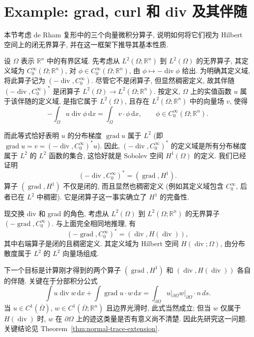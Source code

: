 \section{Example: grad, curl 和 div 及其伴随}\label{sec:vector-operators-adjoints}

本节考虑 de Rham 复形中的三个向量微积分算子, 说明如何将它们视为 Hilbert 空间上的闭无界算子, 并在这一框架下推导其基本性质.

设 $\Omega$ 表示 $\mathbb R^n$ 中的有界区域. 先考虑从 $L^2(\Omega;\mathbb R^n)$ 到 $L^2(\Omega)$ 的无界算子, 其定义域为 $C_0^\infty(\Omega;\mathbb R^n)$, 对 $\phi\in C_0^\infty(\Omega;\mathbb R^n)$, 由 $\phi\mapsto-\operatorname{div}\phi$ 给出. 为明确其定义域, 将此算子记为 $(-\operatorname{div},C_0^\infty)$. 尽管它不是闭算子, 但显然稠密定义, 故其伴随 $(-\operatorname{div},C_0^\infty)^*$ 是闭算子 $L^2(\Omega)\to L^2(\Omega;\mathbb R^n)$. 按定义, $\Omega$ 上的实值函数 $u$ 属于该伴随的定义域, 是指它属于 $L^2(\Omega)$, 且存在 $L^2(\Omega;\mathbb R^n)$ 中的向量场 $v$, 使得
\[
-\int_\Omega u\operatorname{div}\phi\,\mathrm{d}x=\int_\Omega v\cdot\phi\,\mathrm{d}x,\qquad\phi\in C_0^\infty(\Omega;\mathbb R^n).
\]

而此等式恰好表明 $u$ 的分布梯度 $\operatorname{grad}u$ 属于 $L^2$ (即 $\operatorname{grad}u=v=(-\operatorname{div},C_0^\infty)^*u$). 因此, $(-\operatorname{div},C_0^\infty)^*$ 的定义域是所有分布梯度属于 $L^2$ 的 $L^2$ 函数的集合, 这恰好就是 Sobolev 空间 $H^1(\Omega)$ 的定义. 我们已经证明
\[
(-\operatorname{div},C_0^\infty)^*=(\operatorname{grad},H^1).
\]
算子 $(\operatorname{grad},H^1)$ 不仅是闭的, 而且显然也稠密定义 (例如其定义域包含 $C_0^\infty$, 后者已在 $L^2$ 中稠密). 它是闭算子这一事实确立了 $H^1$ 的完备性.

现交换 div 和 grad 的角色, 考虑从 $L^2(\Omega)$ 到 $L^2(\Omega;\mathbb R^n)$ 的无界算子 $(-\operatorname{grad},C_0^\infty)$. 与上面完全相同地推理, 有
\[
(-\operatorname{grad},C_0^\infty)^*=(\operatorname{div},H(\operatorname{div})),
\]
其中右端算子是闭的且稠密定义. 其定义域为 Hilbert 空间 $H(\operatorname{div};\Omega)$, 由分布散度属于 $L^2$ 的 $L^2$ 向量场组成.

下一个目标是计算刚才得到的两个算子 $(\operatorname{grad},H^1)$ 和 $(\operatorname{div},H(\operatorname{div}))$ 各自的伴随. 关键在于分部积分公式
\begin{equation}\label{eq:grad-div-classical-green}
\int u\operatorname{div}w\,\mathrm{d}x+\int\operatorname{grad}u\cdot w\,\mathrm{d}x=\int_{\partial\Omega}u|_{\partial\Omega}w|_{\partial\Omega}\cdot n\,ds.
\end{equation}
当 $u\in C^1(\overline\Omega)$, $w\in C^1(\overline\Omega;\mathbb R^n)$ 且边界光滑时, 此式当然成立; 但当 $w$ 仅属于 $H(\operatorname{div})$ 时, $w$ 在 $\partial\Omega$ 上的迹这类量是否有意义尚不清楚. 因此先研究这一问题. 关键结论见 Theorem~\ref{thm:normal-trace-extension}.

